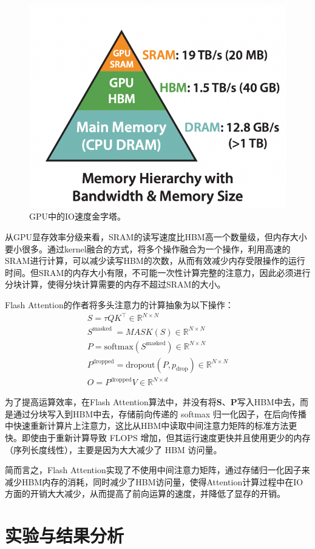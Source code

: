 \documentclass[a4paper]{zreport}
\begin{document}
\begin{figure}[h]
\centering
\includegraphics[width=0.5\linewidth]{figures/flash}
\caption{GPU中的IO速度金字塔。}
\label{fig:flash}
\end{figure}


从GPU显存效率分级来看，SRAM的读写速度比HBM高一个数量级，但内存大小要小很多。通过kernel融合的方式，将多个操作融合为一个操作，利用高速的SRAM进行计算，可以减少读写HBM的次数，从而有效减少内存受限操作的运行时间。但SRAM的内存大小有限，不可能一次性计算完整的注意力，因此必须进行分块计算，使得分块计算需要的内存不超过SRAM的大小。

Flash Attention的作者将多头注意力的计算抽象为以下操作：
\begin{gather}
S=\tau QK^{\top}\in\mathbb{R}^{N\times N} \\
S^\text{masked }=MASK(S)\in\mathbb{R}^{N\times N} \\
P=\mathrm{softmax}\left(S^{\mathrm{masked}}\right)\in\mathbb{R}^{N\times N} \\
P^{\mathrm{dropped}}=\mathrm{dropout} (P,p_{\mathrm{drop}} )\in\mathbb{R}^{N\times N} \\
O=P^{\mathrm{dropped}}V\in\mathbb{R}^{N\times d} 
\end{gather}

为了提高运算效率，在Flash Attention算法中，并没有将$\mathbf{S}\text{、}\mathbf{P}$写入HBM中去，而是通过分块写入到HBM中去，存储前向传递的 softmax 归一化因子，在后向传播中快速重新计算片上注意力，这比从HBM中读取中间注意力矩阵的标准方法更快。即使由于重新计算导致 FLOPS 增加，但其运行速度更快并且使用更少的内存（序列长度线性），主要是因为大大减少了 HBM 访问量。

简而言之，Flash Attention实现了不使用中间注意力矩阵，通过存储归一化因子来减少HBM内存的消耗，同时减少了HBM访问量，使得Attention计算过程中在IO方面的开销大大减少，从而提高了前向运算的速度，并降低了显存的开销。

\section{实验与结果分析}
\end{document}
